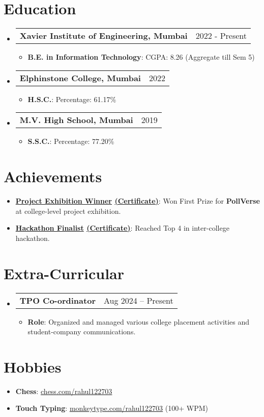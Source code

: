 \documentclass[letterpaper,10pt]{article}
\makeatletter
\newcommand{\resumeItem}[2]{
  \item\small{
    \textbf{#1}{: #2 \vspace{-2pt}}
  }
}
\newcommand{\resumeSubheading}[2]{
  \vspace{-1pt}\item
    \begin{tabular*}{0.97\textwidth}{l@{\extracolsep{\fill}}r}
      \textbf{#1} & #2 \\
    \end{tabular*}\vspace{-4pt}
}
\newcommand{\resumeSubHeadingListStart}{\begin{itemize}[leftmargin=*]}
\newcommand{\resumeSubHeadingListEnd}{\end{itemize}}
\newcommand{\resumeItemListStart}{\begin{itemize}}
\newcommand{\resumeItemListEnd}{\end{itemize}\vspace{-4pt}}
\makeatother
\begin{document}
\section{Education}
\resumeSubHeadingListStart

  \resumeSubheading{Xavier Institute of Engineering, Mumbai}{2022 - Present}
  \resumeItemListStart
    \resumeItem{B.E. in Information Technology}{CGPA: 8.26 (Aggregate till Sem 5)}
  \resumeItemListEnd

  \resumeSubheading{Elphinstone College, Mumbai}{2022}
  \resumeItemListStart
    \resumeItem{H.S.C.}{Percentage: 61.17\%}
  \resumeItemListEnd

  \resumeSubheading{M.V. High School, Mumbai}{2019}
  \resumeItemListStart
    \resumeItem{S.S.C.}{Percentage: 77.20\%}
  \resumeItemListEnd

\resumeSubHeadingListEnd


\section{Achievements}
\resumeSubHeadingListStart
  \resumeItem{\underline{Project Exhibition Winner} \href{https://res.cloudinary.com/dle5gmw0f/image/upload/v1751137649/PollverseFirstPrice_ji8usj.png}{(Certificate)}}{Won First Prize for \textbf{PollVerse} at college-level project exhibition.}
  \resumeItem{\underline{Hackathon Finalist} \href{https://res.cloudinary.com/dle5gmw0f/image/upload/v1751134881/24hrhack_ifojuw.png}{(Certificate)}}{Reached Top 4 in inter-college hackathon.}
\resumeSubHeadingListEnd

\section{Extra-Curricular}
\resumeSubHeadingListStart
  \resumeSubheading{TPO Co-ordinator}{Aug 2024 -- Present}
    \resumeItemListStart
      \resumeItem{Role}{Organized and managed various college placement activities and student-company communications.}
    \resumeItemListEnd
\resumeSubHeadingListEnd

\section{Hobbies}
\resumeSubHeadingListStart
  \resumeItem{Chess}{\href{https://www.chess.com/member/rahul122703}{\faChess \hspace{0.1cm} \underline{chess.com/rahul122703}}}
  \resumeItem{Touch Typing}{\href{https://monkeytype.com/profile/rahul122703}{\faKeyboardO \hspace{0.1cm} \underline{monkeytype.com/rahul122703}} (100+ WPM)}
\resumeSubHeadingListEnd
\end{document}
